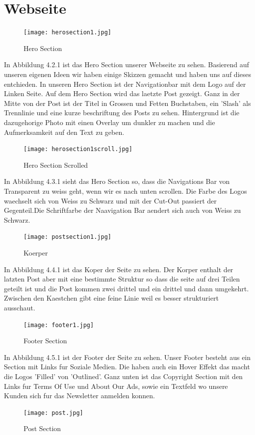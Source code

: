 \section{Webseite}
\begin{figure}[!h]
  \texttt{[image: herosection1.jpg]}
  \caption{Hero Section}
  \label{fig:Hero}
\end{figure}
In Abbildung 4.2.1 ist das Hero Section unserer Webseite zu sehen. Basierend auf unseren eigenen Ideen wir haben einige Skizzen gemacht und haben uns auf dieses entchieden. In unseren Hero Section ist der Navigationbar mit dem Logo auf der Linken Seite. Auf dem Hero Section wird das laetzte Post gezeigt. Ganz in der Mitte von der Post ist der Titel in Grossen und Fetten Buchstaben, ein 'Slash' als Trennlinie und eine kurze beschriftung des Posts zu sehen. Hintergrund ist die dazugehorige Photo mit einen Overlay um dunkler zu machen und die Aufmerksamkeit auf den Text zu geben.
\newpage
\begin{figure}[!h]
  \texttt{[image: herosection1scroll.jpg]}
  \caption{Hero Section Scrolled}
  \label{fig:Hero}
\end{figure}
In Abbildung 4.3.1 sieht das Hero Section so, dass die Navigations Bar von Transparent zu weiss geht, wenn wir es nach unten scrollen.
Die Farbe des Logos waechselt sich von Weiss zu Schwarz und mit der Cut-Out passiert der Gegenteil.Die Schriftfarbe der Naavigation Bar aendert sich auch von Weiss zu Schwarz. 
\newline
\begin{figure}[!h]
  \texttt{[image: postsection1.jpg]}
  \caption{Koerper }
  \label{fig:Koerper}
\end{figure}

In Abbildung 4.4.1 ist das Koper der Seite zu sehen.
Der Korper enthalt der latzten Post aber mit eine bestimmte Struktur so dass die seite auf drei Teilen geteilt ist und die Post kommen zwei drittel und ein drittel und dann umgekehrt. Zwischen den Kaestchen gibt eine feine Linie weil es besser strukturiert ausschaut.
\newline
\begin{figure}[!h]
  \texttt{[image: footer1.jpg]}
  \caption{Footer Section}
  \label{fig:footer}
\end{figure}
In Abbildung 4.5.1 ist der Footer der Seite zu sehen.
Unser Footer besteht aus ein Section mit Links fur Soziale Medien. Die haben auch ein Hover Effekt das macht die Logos 'Filled' von 'Outlined'. Ganz unten ist das Copyright Section mit den Links fur Terms Of Use und About Our Ads, sowie ein Textfeld wo unsere Kunden sich fur das Newsletter anmelden konnen.
\newpage
\begin{figure}[!h]
  \texttt{[image: post.jpg]}
  \caption{Post Section}
  \label{fig:post}
\end{figure}

